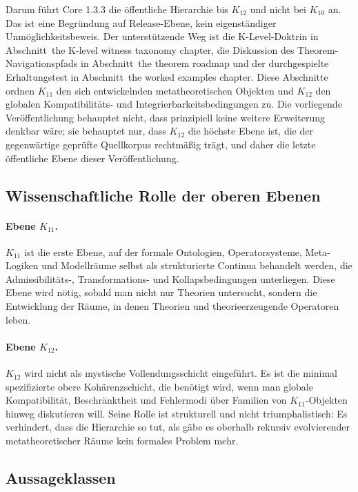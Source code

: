 Darum führt Core 1.3.3 die öffentliche Hierarchie bis \(K_{12}\) und nicht
bei \(K_{10}\) an. Das ist eine Begründung auf Release-Ebene, kein
eigenständiger Unmöglichkeitsbeweis. Der unterstützende Weg ist die
K-Level-Doktrin in Abschnitt~the K-level witness taxonomy chapter, die Diskussion des
Theorem-Navigationspfads in Abschnitt~the theorem roadmap und der
durchgespielte Erhaltungstest in Abschnitt~the worked examples chapter.
Diese Abschnitte ordnen \(K_{11}\) den sich entwickelnden metatheoretischen
Objekten und \(K_{12}\) den globalen Kompatibilitäts- und
Integrierbarkeitsbedingungen zu. Die vorliegende Veröffentlichung behauptet
nicht, dass prinzipiell keine weitere Erweiterung denkbar wäre; sie behauptet
nur, dass \(K_{12}\) die höchste Ebene ist, die der gegenwärtige geprüfte
Quellkorpus rechtmäßig trägt, und daher die letzte öffentliche Ebene dieser
Veröffentlichung.

\subsection{Wissenschaftliche Rolle der oberen Ebenen}

\paragraph{Ebene \texorpdfstring{$K_{11}$}{K11}.}
\(K_{11}\) ist die erste Ebene, auf der formale Ontologien, Operatorsysteme,
Meta-Logiken und Modellräume selbst als strukturierte Continua behandelt
werden, die Admissibilitäts-, Transformations- und Kollapsbedingungen
unterliegen.
Diese Ebene wird nötig, sobald man nicht nur Theorien untersucht, sondern die
Entwicklung der Räume, in denen Theorien und theorieerzeugende Operatoren leben.

\paragraph{Ebene \texorpdfstring{$K_{12}$}{K12}.}
\(K_{12}\) wird nicht als mystische Vollendungsschicht eingeführt.
Es ist die minimal spezifizierte obere Kohärenzschicht, die benötigt wird,
wenn man globale Kompatibilität, Beschränktheit und Fehlermodi über Familien
von \(K_{11}\)-Objekten hinweg diskutieren will.
Seine Rolle ist strukturell und nicht triumphalistisch: Es verhindert, dass
die Hierarchie so tut, als gäbe es oberhalb rekursiv evolvierender
metatheoretischer Räume kein formales Problem mehr.

\subsection{Aussageklassen}


